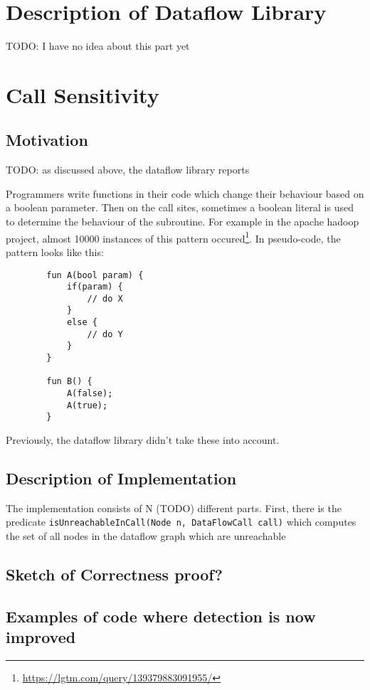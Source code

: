 \newpage
\section{Description of Dataflow Library}
TODO: I have no idea about this part yet



\newpage
\section{Call Sensitivity}
\subsection{Motivation}
TODO: as discussed above, the dataflow library reports 

Programmers write functions in their code which change their behaviour based on 
a boolean parameter.
Then on the call sites, sometimes a boolean literal is used to determine the behaviour
of the subroutine.
For example in the apache hadoop project, almost 10000 instances of this
pattern occured\footnote{\url{https://lgtm.com/query/139379883091955/}}.
In pseudo-code, the pattern looks like this:
\begin{verbatim}
        fun A(bool param) {
            if(param) {
                // do X
            }
            else {
                // do Y
            }
        }

        fun B() {
            A(false);
            A(true);
        }
\end{verbatim}


Previously, the dataflow library didn't take these into account.


\subsection{Description of Implementation}
The implementation consists of N (TODO) different parts.
First, there is the predicate \texttt{isUnreachableInCall(Node n, DataFlowCall call)} which
computes the set of all nodes in the dataflow graph which are unreachable 
\subsection{Sketch of Correctness proof?}
\subsection{Examples of code where detection is now improved}
